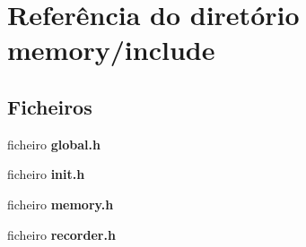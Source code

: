 \section{Referência do diretório memory/include}
\label{dir_65e15126d72ed444e057744f23ffe47a}
\subsection*{Ficheiros}
\begin{DoxyCompactItemize}
\item 
ficheiro \textbf{ global.\+h}
\item 
ficheiro \textbf{ init.\+h}
\item 
ficheiro \textbf{ memory.\+h}
\item 
ficheiro \textbf{ recorder.\+h}
\end{DoxyCompactItemize}
